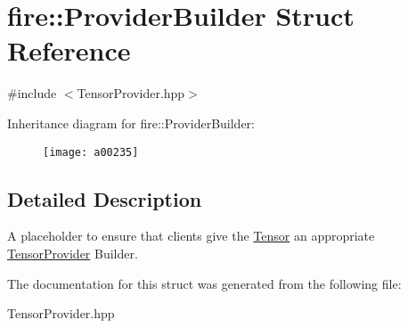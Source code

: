 \hypertarget{a00235}{}\section{fire\+:\+:Provider\+Builder Struct Reference}
\label{a00235}


{\ttfamily \#include $<$Tensor\+Provider.\+hpp$>$}

Inheritance diagram for fire\+:\+:Provider\+Builder\+:\begin{figure}[H]
\begin{center}
\leavevmode
\texttt{[image: a00235]}
\end{center}
\end{figure}


\subsection{Detailed Description}
A placeholder to ensure that clients give the \hyperlink{a00299}{Tensor} an appropriate \hyperlink{a00300}{Tensor\+Provider} Builder. 

The documentation for this struct was generated from the following file\+:\begin{DoxyCompactItemize}
\item 
Tensor\+Provider.\+hpp\end{DoxyCompactItemize}
